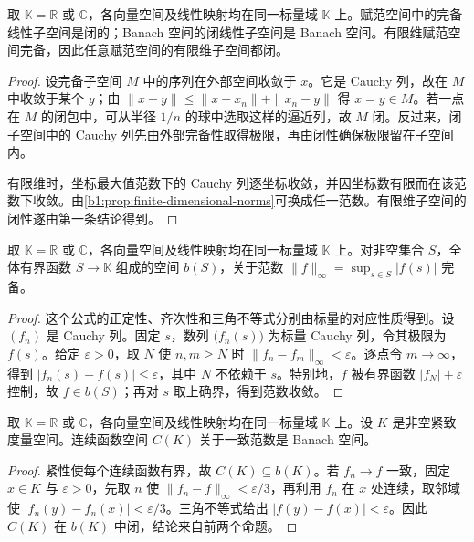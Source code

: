 \begin{proposition}\label{b1:prop:closed-subspace-complete}
取 \(\mathbb K=\mathbb R\) 或 \(\mathbb C\)，各向量空间及线性映射均在同一标量域 \(\mathbb K\) 上。赋范空间中的完备线性子空间是闭的；Banach 空间的闭线性子空间是 Banach 空间。有限维赋范空间完备，因此任意赋范空间的有限维子空间都闭。
\end{proposition}
\begin{proof}
设完备子空间 \(M\) 中的序列在外部空间收敛于 \(x\)。它是 Cauchy 列，故在 \(M\) 中收敛于某个 \(y\)；由 \(\|x-y\|\leq\|x-x_n\|+\|x_n-y\|\) 得 \(x=y\in M\)。若一点在 \(M\) 的闭包中，可从半径 \(1/n\) 的球中选取这样的逼近列，故 \(M\) 闭。反过来，闭子空间中的 Cauchy 列先由外部完备性取得极限，再由闭性确保极限留在子空间内。

有限维时，坐标最大值范数下的 Cauchy 列逐坐标收敛，并因坐标数有限而在该范数下收敛。由\cref{b1:prop:finite-dimensional-norms}可换成任一范数。有限维子空间的闭性遂由第一条结论得到。
\end{proof}

\begin{proposition}\label{b1:prop:bounded-functions-complete}
取 \(\mathbb K=\mathbb R\) 或 \(\mathbb C\)，各向量空间及线性映射均在同一标量域 \(\mathbb K\) 上。对非空集合 \(S\)，全体有界函数 \(S\rightarrow\mathbb K\) 组成的空间 \(b(S)\)，关于范数 \(\|f\|_\infty=\sup_{s\in S}|f(s)|\) 完备。
\end{proposition}
\begin{proof}
这个公式的正定性、齐次性和三角不等式分别由标量的对应性质得到。设 \((f_n)\) 是 Cauchy 列。固定 \(s\)，数列 \(\bigl(f_n(s)\bigr)\) 为标量 Cauchy 列，令其极限为 \(f(s)\)。给定 \(\varepsilon>0\)，取 \(N\) 使 \(n,m\geq N\) 时 \(\|f_n-f_m\|_\infty<\varepsilon\)。逐点令 \(m\to\infty\)，得到 \(|f_n(s)-f(s)|\leq\varepsilon\)，其中 \(N\) 不依赖于 \(s\)。特别地，\(f\) 被有界函数 \(|f_N|+\varepsilon\) 控制，故 \(f\in b(S)\)；再对 \(s\) 取上确界，得到范数收敛。
\end{proof}

\begin{corollary}\label{b1:cor:continuous-functions-complete}
取 \(\mathbb K=\mathbb R\) 或 \(\mathbb C\)，各向量空间及线性映射均在同一标量域 \(\mathbb K\) 上。设 \(K\) 是非空紧致度量空间。连续函数空间 \(C(K)\) 关于一致范数是 Banach 空间。
\end{corollary}
\begin{proof}
紧性使每个连续函数有界，故 \(C(K)\subseteq b(K)\)。若 \(f_n\to f\) 一致，固定 \(x\in K\) 与 \(\varepsilon>0\)，先取 \(n\) 使 \(\|f_n-f\|_\infty<\varepsilon/3\)，再利用 \(f_n\) 在 \(x\) 处连续，取邻域使 \(|f_n(y)-f_n(x)|<\varepsilon/3\)。三角不等式给出 \(|f(y)-f(x)|<\varepsilon\)。因此 \(C(K)\) 在 \(b(K)\) 中闭，结论来自前两个命题。
\end{proof}

